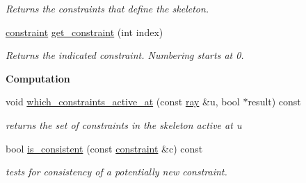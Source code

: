 \begin{Indent}
\begin{DoxyCompactItemize}
\begin{DoxyCompactList}\small\item\em Returns the constraints that define the skeleton. \end{DoxyCompactList}\item 
\mbox{\label{group___c_l_s_solvers_a8c0ceb21b570a4a4084902a497de79a0}} 
\hyperlink{group___c_l_s_solvers_classconstraint}{constraint} \hyperlink{group___c_l_s_solvers_a8c0ceb21b570a4a4084902a497de79a0}{get\+\_\+constraint} (int index)
\begin{DoxyCompactList}\small\item\em Returns the indicated constraint. Numbering starts at 0. \end{DoxyCompactList}\end{DoxyCompactItemize}
\end{Indent}
\begin{Indent}\textbf{ Computation}\par
\begin{DoxyCompactItemize}
\item 
\mbox{\label{group___c_l_s_solvers_a6b48120d11e7b244c14c748d990d2ade}} 
void \hyperlink{group___c_l_s_solvers_a6b48120d11e7b244c14c748d990d2ade}{which\+\_\+constraints\+\_\+active\+\_\+at} (const \hyperlink{group___c_l_s_solvers_classray}{ray} \&u, bool $\ast$result) const
\begin{DoxyCompactList}\small\item\em returns the set of constraints in the skeleton active at {\ttfamily u} \end{DoxyCompactList}\item 
\mbox{\label{group___c_l_s_solvers_aca399adccf69ea8f9df6cf557526032b}} 
bool \hyperlink{group___c_l_s_solvers_aca399adccf69ea8f9df6cf557526032b}{is\+\_\+consistent} (const \hyperlink{group___c_l_s_solvers_classconstraint}{constraint} \&c) const
\begin{DoxyCompactList}\small\item\em tests for consistency of a potentially new constraint. \end{DoxyCompactList}\end{DoxyCompactItemize}
\end{Indent}
